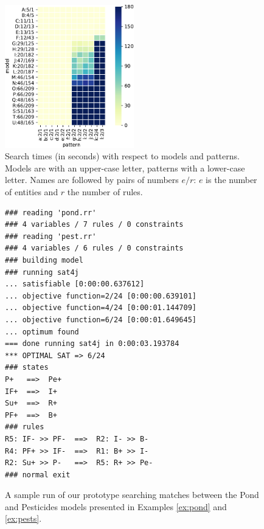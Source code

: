 \documentclass[a4paper,twoside]{article}
\begin{document}
\begin{figure}[t!]
  \begin{center}
    \includegraphics[width=0.5\textwidth]{heatmap}
  \end{center}
  \caption{Search times (in seconds) with respect to models and patterns. Models are with an upper-case letter,  patterns with a lower-case letter.
 Names are followed by pairs of numbers $e/r$: $e$ is the number of entities and $r$ the number of rules.}
  \label{fig:heatmap}
\end{figure}

\begin{figure}[t]
\begin{small}
\begin{verbatim}
### reading 'pond.rr'
### 4 variables / 7 rules / 0 constraints
### reading 'pest.rr'
### 4 variables / 6 rules / 0 constraints
### building model
### running sat4j
... satisfiable [0:00:00.637612]
... objective function=2/24 [0:00:00.639101]
... objective function=4/24 [0:00:01.144709]
... objective function=6/24 [0:00:01.649645]
... optimum found
=== done running sat4j in 0:00:03.193784
*** OPTIMAL SAT => 6/24
### states
P+   ==>  Pe+
IF+  ==>  I+
Su+  ==>  R+
PF+  ==>  B+
### rules
R5: IF- >> PF-  ==>  R2: I- >> B-
R4: PF+ >> IF-  ==>  R1: B+ >> I-
R2: Su+ >> P-   ==>  R5: R+ >> Pe-
### normal exit
\end{verbatim}
\end{small}
\caption{A sample run of our prototype searching matches between the Pond and Pesticides models presented in Examples \ref{ex:pond} and \ref{ex:pests}.}
\label{fig:run}
\end{figure}
\end{document}
